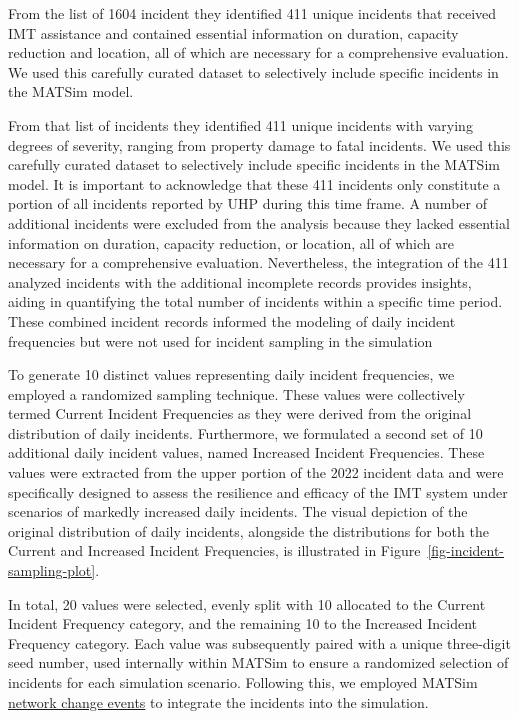 \documentclass[fancy, oneside, mastersfancy, ms]{byuthesis}
\begin{document}
From the list of 1604 incident they identified 411 unique incidents that
received IMT assistance and contained essential information on duration,
capacity reduction and location, all of which are necessary for a
comprehensive evaluation. We used this carefully curated dataset to
selectively include specific incidents in the MATSim model.

From that list of incidents they identified 411 unique incidents with
varying degrees of severity, ranging from property damage to fatal
incidents. We used this carefully curated dataset to selectively include
specific incidents in the MATSim model. It is important to acknowledge
that these 411 incidents only constitute a portion of all incidents
reported by UHP during this time frame. A number of additional incidents
were excluded from the analysis because they lacked essential
information on duration, capacity reduction, or location, all of which
are necessary for a comprehensive evaluation. Nevertheless, the
integration of the 411 analyzed incidents with the additional incomplete
records provides insights, aiding in quantifying the total number of
incidents within a specific time period. These combined incident records
informed the modeling of daily incident frequencies but were not used
for incident sampling in the simulation

To generate 10 distinct values representing daily incident frequencies,
we employed a randomized sampling technique. These values were
collectively termed Current Incident Frequencies as they were derived
from the original distribution of daily incidents. Furthermore, we
formulated a second set of 10 additional daily incident values, named
Increased Incident Frequencies. These values were extracted from the
upper portion of the 2022 incident data and were specifically designed
to assess the resilience and efficacy of the IMT system under scenarios
of markedly increased daily incidents. The visual depiction of the
original distribution of daily incidents, alongside the distributions
for both the Current and Increased Incident Frequencies, is illustrated
in Figure~\ref{fig-incident-sampling-plot}.

In total, 20 values were selected, evenly split with 10 allocated to the
Current Incident Frequency category, and the remaining 10 to the
Increased Incident Frequency category. Each value was subsequently
paired with a unique three-digit seed number, used internally within
MATSim to ensure a randomized selection of incidents for each simulation
scenario. Following this, we employed MATSim
\protect\hyperlink{sec-NCE}{network change events} to integrate the
incidents into the simulation.
\end{document}
